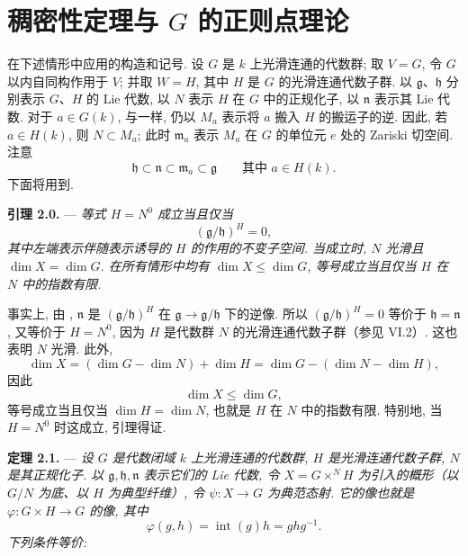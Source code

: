\section{稠密性定理与 \texorpdfstring{\(G\)}{G} 的正则点理论}

在下述情形中应用的构造和记号. 设 \(G\) 是 \(k\) 上光滑连通的代数群; 取 \(V=G\), 令 \(G\) 以内自同构作用于 \(V\); 并取 \(W=H\), 其中 \(H\) 是 \(G\) 的光滑连通代数子群. 以 \(\mathfrak g\)、\(\mathfrak h\) 分别表示 \(G\)、\(H\) 的 Lie 代数, 以 \(N\) 表示 \(H\) 在 \(G\) 中的正规化子, 以 \(\mathfrak n\) 表示其 Lie 代数. 对于 \(a\in G(k)\), 与一样, 仍以 \(M_a\) 表示将 \(a\) 搬入 \(H\) 的搬运子的逆. 因此, 若 \(a\in H(k)\), 则 \(N\subset M_a\); 此时 \(\mathfrak m_a\) 表示 \(M_a\) 在 \(G\) 的单位元 \(e\) 处的 Zariski 切空间. 注意
\[
  \mathfrak h\subset\mathfrak n\subset\mathfrak m_a
  \subset\mathfrak g
  \qquad\text{其中 }a\in H(k).
\]
下面将用到.

\medskip
\noindent{}\textbf{引理 2.0.} ---
\textit{等式 \(H=N^0\) 成立当且仅当}
\[
  (\mathfrak g/\mathfrak h)^H=0,
\]
\textit{其中左端表示伴随表示诱导的 \(H\) 的作用的不变子空间. 当成立时, \(N\) 光滑且 \(\dim X=\dim G\). 在所有情形中均有 \(\dim X\leq\dim G\), 等号成立当且仅当 \(H\) 在 \(N\) 中的指数有限.}

事实上, 由 , \(\mathfrak n\) 是 \((\mathfrak g/\mathfrak h)^H\) 在 \(\mathfrak g\to\mathfrak g/\mathfrak h\) 下的逆像. 所以 \((\mathfrak g/\mathfrak h)^H=0\) 等价于 \(\mathfrak h=\mathfrak n\), 又等价于 \(H=N^0\), 因为 \(H\) 是代数群 \(N\) 的光滑连通代数子群（参见 VI.2）. 这也表明 \(N\) 光滑. 此外,
\[
  \dim X=(\dim G-\dim N)+\dim H
        =\dim G-(\dim N-\dim H),
\]
因此
\[
  \dim X\leq\dim G,
\]
等号成立当且仅当 \(\dim H=\dim N\), 也就是 \(H\) 在 \(N\) 中的指数有限. 特别地, 当 \(H=N^0\) 时这成立, 引理得证.

\medskip
\noindent{}\textbf{定理 2.1.} ---
\textit{设 \(G\) 是代数闭域 \(k\) 上光滑连通的代数群, \(H\) 是光滑连通代数子群, \(N\) 是其正规化子. 以 \(\mathfrak g,\mathfrak h,\mathfrak n\) 表示它们的 Lie 代数, 令 \(X=G\times^N H\) 为引入的概形（以 \(G/N\) 为底、以 \(H\) 为典型纤维）, 令 \(\psi:X\to G\) 为典范态射. 它的像也就是 \(\varphi:G\times H\to G\) 的像, 其中}
\[
  \varphi(g,h)=\operatorname{int}(g)h=ghg^{-1}.
\]
\textit{下列条件等价:}

